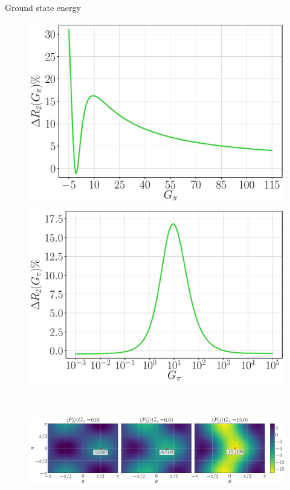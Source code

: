 \documentclass[9pt, handout, aspectratio=169]{beamer}	%
\begin{document}
\begin{frame}[allowframebreaks]{Ground state energy}
	\begin{figure}[!p]
		\centering
		\begin{minipage}[c]{.4\linewidth}
			\centering
			\includegraphics[width=.8\linewidth]{Figures/NJL1-model-solving/G2-err}
		\end{minipage}
		\hspace{.025\linewidth}
		\begin{minipage}[c]{.4\linewidth}
			\centering
			\includegraphics[width=.8\linewidth]{Figures/NJL1-model-solving/G2-logerr}
		\end{minipage} \\[-1em]
		\begin{center}
			\includegraphics[width=.7\paperwidth]{Figures/NJL1-model-solving/P2-tri-contour}
		\end{center}
	\end{figure}
	\vspace{-2em}

\end{frame}
\end{document}
